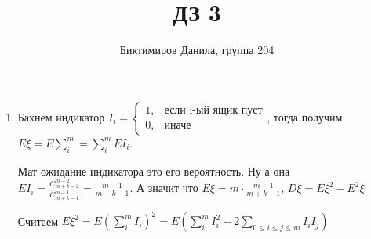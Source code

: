 \documentclass[11pt]{article}
\begin{document}
	
	\author{Биктимиров Данила, группа 204}
	\title{ДЗ 3}
	\date{}
	\maketitle
	
	\medskip
	
	\begin{enumerate}
		
		\item Бахнем индикатор $I_i=\begin{cases}
			1, &\text{если i-ый ящик пуст}\\
			0, &\text{иначе}
		\end{cases}$, тогда получим $E\xi=E\sum_{i}^{m}=\sum_{i}^{m}EI_i$.
	
		Мат ожидание индикатора это его вероятность. Ну а она $EI_i=\frac{C^{m-2}_{m+k-2}}{C^{m-1}_{m+k-1}}=\frac{m-1}{m+k-1}$. А значит что $E\xi=m\cdot \frac{m-1}{m+k-1}$, $D\xi = E\xi^2-E^2\xi$
		
		Считаем $E\xi^2=E(\sum_{i}^{m}I_i)^2=E\left(\sum_{i}^{m}I^2_i + 2\sum_{0\le i\le j\le m}I_iI_j\right)$
		
	\end{enumerate}
\end{document}
